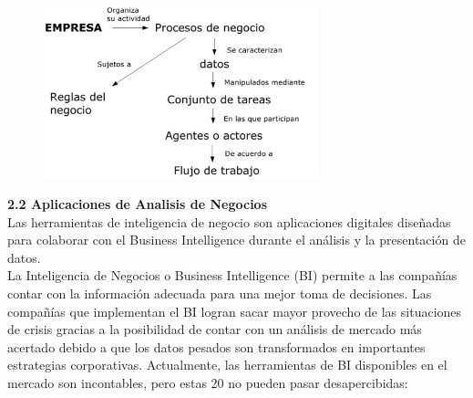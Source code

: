 \documentclass[a4paper,12pt,twocolumn]{article}
\begin{document}
\textbf{}\\
\begin{figure}[h!]
\centering
\includegraphics[width=8cm]{./Imagenes/anegocios}
\end{figure}
\textbf{2.2 Aplicaciones de Analisis de Negocios}\\
Las herramientas de inteligencia de negocio son aplicaciones digitales diseñadas para colaborar con el Business Intelligence durante el análisis y la presentación de datos.\\
La Inteligencia de Negocios o Business Intelligence (BI) permite a las compañías contar con la información adecuada para una mejor toma de decisiones.  Las compañías que implementan el BI logran sacar mayor provecho de las situaciones de crisis gracias a la posibilidad de contar con un análisis de mercado más acertado debido a que los datos pesados son transformados en importantes estrategias corporativas.
Actualmente, las herramientas de BI disponibles en el mercado son incontables, pero estas 20 no pueden pasar desapercibidas:
\textbf{}\\
\textbf{}\\
\textbf{}\\
\end{document}
